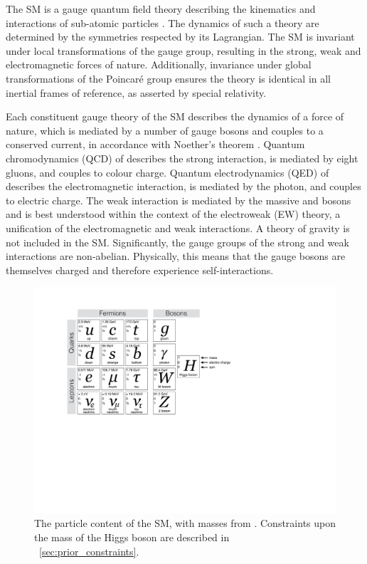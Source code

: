 
The SM is a gauge quantum field theory describing the kinematics and interactions of 
sub-atomic particles 
\cite{Aitchison,Peskin,Glashow:1961,Weinberg:1967,Salam:1968,'tHooft:1972}. 
The dynamics of such a theory are determined 
by the symmetries respected by its Lagrangian. The SM is invariant under local 
transformations of the \SMgroup gauge group, resulting in the strong, weak and 
electromagnetic forces of nature. Additionally, invariance under global transformations of 
the Poincaré group ensures the theory is identical in all inertial frames of reference, as 
asserted by special relativity.

Each constituent gauge theory of the SM describes the dynamics of a force of nature, 
which is mediated by a number of gauge bosons and couples to a conserved current, in 
accordance with Noether's theorem \cite{Noether:1918}. Quantum chromodynamics (QCD) of 
 describes the strong interaction, is mediated by eight gluons, and couples to 
colour charge. Quantum electrodynamics (QED) of  describes the electromagnetic 
interaction, is mediated by the photon, and couples to electric charge. The weak 
interaction is mediated by the massive \PWpm and \PZ bosons and is best understood within 
the context of the electroweak (EW) theory, a unification of the electromagnetic and weak 
interactions. A theory of gravity is not included in the SM. Significantly, the gauge 
groups of the strong and weak interactions are non-abelian. Physically, this means that 
the gauge bosons are themselves charged and therefore experience self-interactions.

\begin{figure}
	\includegraphics[width=\largefigwidth,clip=true,trim=3.9cm 11.8cm 12.6cm 2.6cm]{custom_images/sm_particles}
	\caption{The particle content of the SM, with masses from \cite{PDG:2012}. 
	Constraints upon the mass of the Higgs boson are described in 
	\Section~\ref{sec:prior_constraints}.}
	\label{fig:sm_particles}
\end{figure}

